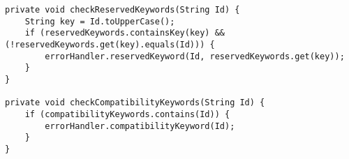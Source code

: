 \begin{lstlisting}[caption={Private functions in the reserved keyword visitor for comparing a given Id with reserved keywords.}, label={code:RKW:keywordCheck}]
private void checkReservedKeywords(String Id) {
    String key = Id.toUpperCase();
    if (reservedKeywords.containsKey(key) && (!reservedKeywords.get(key).equals(Id))) {
        errorHandler.reservedKeyword(Id, reservedKeywords.get(key));
    }
}

private void checkCompatibilityKeywords(String Id) {
    if (compatibilityKeywords.contains(Id)) {
        errorHandler.compatibilityKeyword(Id);
    }
}
\end{lstlisting}